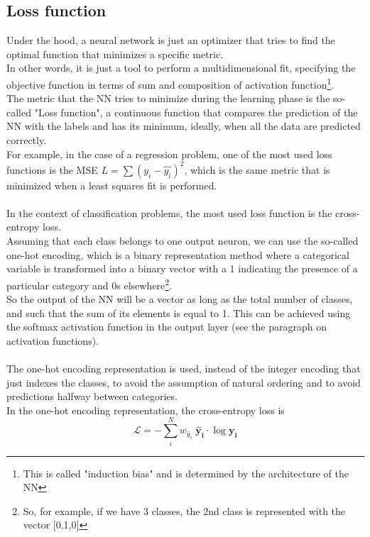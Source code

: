 \subsection{Loss function}
Under the hood, a neural network is just an optimizer that tries to find the optimal function that minimizes a specific metric.\\
In other words, it is just a tool to perform a multidimensional fit, specifying the objective function in terms of sum and composition of activation function\footnote{This is called "induction bias" and is determined by the architecture of the NN}.\\
The metric that the NN tries to minimize during the learning phase is the so-called "Loss function", a continuous function that compares the prediction of the NN with the labels and has its minimum, ideally, when all the data are predicted correctly.\\
For example, in the case of a regression problem, one of the most used loss functions is the MSE $L=\sum(y_i-\hat{y_i})^2$, which is the same metric that is minimized when a least squares fit is performed.\\
\\
In the context of classification problems, the most used loss function is the cross-entropy loss.\\
Assuming that each class belongs to one output neuron, we can use the so-called one-hot encoding, which is a binary representation method where a categorical variable is transformed into a binary vector with a 1 indicating the presence of a particular category and 0s elsewhere\footnote{So, for example, if we have 3 classes, the 2nd class is represented with the vector [0,1,0]}.\\
So the output of the NN will be a vector as long as the total number of classes, and such that the sum of its elements is equal to 1. This can be achieved using the softmax activation function in the output layer (see the paragraph on activation functions).
\\
\\
The one-hot encoding representation is used, instead of the integer encoding that just indexes the classes, to avoid the assumption of natural ordering and to avoid predictions halfway between categories.\\
In the one-hot encoding representation, the cross-entropy loss is
\begin{equation}
    \mathcal{L}=-\sum_i^N w_{\hat{y}_i} \; \bm{\hat{y}_i} \cdot \log \bm{y_i}
\end{equation}
